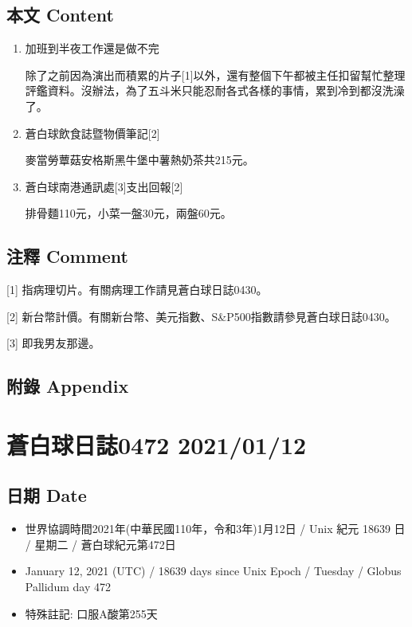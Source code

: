 \documentclass[
]{article}
\providecommand{\tightlist}{%
  \setlength{\itemsep}{0pt}\setlength{\parskip}{0pt}}
\begin{document}
\hypertarget{ux672cux6587-content-10}{%
\subsection{本文 Content}\label{ux672cux6587-content-10}}

\begin{enumerate}
\def\labelenumi{\arabic{enumi}.}
\item
  加班到半夜工作還是做不完

  除了之前因為演出而積累的片子{[}1{]}以外，還有整個下午都被主任扣留幫忙整理評鑑資料。沒辦法，為了五斗米只能忍耐各式各樣的事情，累到冷到都沒洗澡了。
\item
  蒼白球飲食誌暨物價筆記{[}2{]}

  麥當勞蕈菇安格斯黑牛堡中薯熱奶茶共215元。
\item
  蒼白球南港通訊處{[}3{]}支出回報{[}2{]}

  排骨麵110元，小菜一盤30元，兩盤60元。
\end{enumerate}

\hypertarget{ux6ce8ux91cb-comment-10}{%
\subsection{注釋 Comment}\label{ux6ce8ux91cb-comment-10}}

{[}1{]} 指病理切片。有關病理工作請見蒼白球日誌0430。

{[}2{]}
新台幣計價。有關新台幣、美元指數、S\&P500指數請參見蒼白球日誌0430。

{[}3{]} 即我男友那邊。

\hypertarget{ux9644ux9304-appendix-10}{%
\subsection{附錄 Appendix}\label{ux9644ux9304-appendix-10}}

\hypertarget{ux84bcux767dux7403ux65e5ux8a8c0472-20210112}{%
\section{蒼白球日誌0472
2021/01/12}\label{ux84bcux767dux7403ux65e5ux8a8c0472-20210112}}

\hypertarget{ux65e5ux671f-date-11}{%
\subsection{日期 Date}\label{ux65e5ux671f-date-11}}

\begin{itemize}
\tightlist
\item
  世界協調時間2021年(中華民國110年，令和3年)1月12日 / Unix 紀元 18639 日
  / 星期二 / 蒼白球紀元第472日
\item
  January 12, 2021 (UTC) / 18639 days since Unix Epoch / Tuesday /
  Globus Pallidum day 472
\item
  特殊註記: 口服A酸第255天
\end{itemize}
\end{document}
